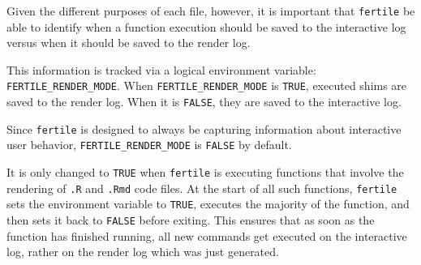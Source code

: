 \documentclass[12pt,twoside]{reedthesis}
\begin{document}
Given the different purposes of each file, however, it is important that
\texttt{fertile} be able to identify when a function execution should be
saved to the interactive log versus when it should be saved to the
render log.

This information is tracked via a logical environment variable:
\texttt{FERTILE\_RENDER\_MODE}. When \texttt{FERTILE\_RENDER\_MODE} is
\texttt{TRUE}, executed shims are saved to the render log. When it is
\texttt{FALSE}, they are saved to the interactive log.

Since \texttt{fertile} is designed to always be capturing information
about interactive user behavior, \texttt{FERTILE\_RENDER\_MODE} is
\texttt{FALSE} by default.

It is only changed to \texttt{TRUE} when \texttt{fertile} is executing
functions that involve the rendering of \texttt{.R} and \texttt{.Rmd}
code files. At the start of all such functions, \texttt{fertile} sets
the environment variable to \texttt{TRUE}, executes the majority of the
function, and then sets it back to \texttt{FALSE} before exiting. This
ensures that as soon as the function has finished running, all new
commands get executed on the interactive log, rather on the render log
which was just generated.
\end{document}
